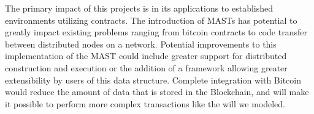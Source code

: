 \documentclass{vldb}
\begin{document}
The primary impact of this projects is in its applications to established
environments utilizing contracts. The introduction of MASTs has potential to
greatly impact existing problems ranging from bitcoin contracts to code
transfer between distributed nodes on a network. Potential improvements to this
implementation of the MAST could include greater support for distributed
construction and execution or the addition of a framework allowing greater
extensibility by users of this data structure. Complete integration with
Bitcoin would reduce the amount of data that is stored in the Blockchain, and
will make it possible to perform more complex transactions like the will we
modeled.

\vfill



\end{document}

